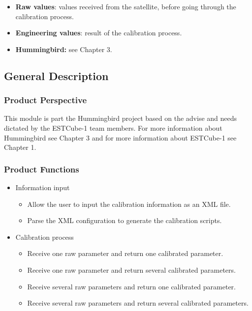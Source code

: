 \begin{itemize}
\item \textbf{Raw values}: values received from the satellite, before going through the calibration process.
\item \textbf{Engineering values}: result of the calibration process.
\item \textbf{Hummingbird:} see Chapter 3.
\end{itemize}

\subsection{General Description}
\subsubsection{Product Perspective}

This module is part the Hummingbird project based on the advise and needs dictated by the ESTCube-1 team members. For more information about Hummingbird see Chapter 3 and for more information about ESTCube-1 see Chapter 1. 

\subsubsection{Product Functions}

\begin{itemize}
\item Information input
\begin{itemize}
\item Allow the user to input the calibration information as an XML file.
\item Parse the XML configuration to generate the calibration scripts.
\end{itemize}
\item Calibration process
\begin{itemize}
\item Receive one raw parameter and return one calibrated parameter.
\item Receive one raw parameter and return several calibrated parameters.
\item Receive several raw parameters and return one calibrated parameter.
\item Receive several raw parameters and return several calibrated parameters.
\end{itemize}

\end{itemize}

